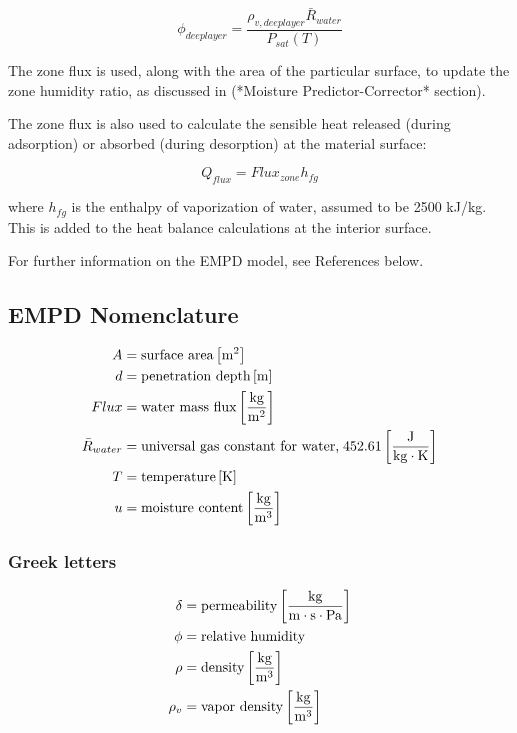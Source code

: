 \begin{equation}
\phi_{deeplayer} = \frac {\rho_{v,deeplayer} \bar R_{water}} {P_{sat}(T)}
\end{equation}

The zone flux is used, along with the area of the particular surface, to update the zone humidity ratio, as discussed in (*Moisture Predictor-Corrector* section).

The zone flux is also used to calculate the sensible heat released (during adsorption) or absorbed (during desorption) at the material surface:

\begin{equation}
Q_{flux} = Flux_{zone} h_{fg}
\end{equation}

where $h_{fg}$ is the enthalpy of vaporization of water, assumed to be 2500 kJ/kg. This is added to the heat balance calculations at the interior surface.

For further information on the EMPD model, see References below.

\subsection{EMPD Nomenclature}\label{empd-nomenclature}
\begin{align*}  
  A  &= \text{surface area} \bracketunits{m^{2}} \\
  d &= \text{penetration depth} \bracketunits{m} \\
  Flux &= \text{water mass flux} \bracketunits{\frac{kg}{m^{2}}} \\
  \bar R_{water} &= \text{universal gas constant for water,} \; 452.61 \bracketunits{\frac{J}{kg \cdot K}}   \\
  T &= \text{temperature} \bracketunits{K} \\
  u &= \text{moisture content} \bracketunits{\frac{kg}{m^{3}}}
\end{align*}

\subsubsection{Greek letters}\label{greek-letters}
\begin{align*}  
  \delta  &= \text{permeability} \bracketunits{\frac{kg}{m \cdot s \cdot Pa}} \\
  \phi &= \text{relative humidity} \\
  \rho &= \text{density} \bracketunits{\frac{kg}{m^{3}}} \\
  \rho_{v} &= \text{vapor density} \bracketunits{\frac{kg}{m^{3}}} \\
\end{align*}

